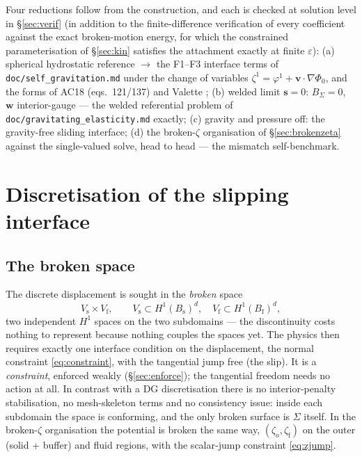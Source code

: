 \documentclass[11pt]{article}
\newcommand{\eps}{\varepsilon}
\newcommand{\Bs}{B_{\mathrm{s}}}
\newcommand{\Bf}{B_{\mathrm{f}}}
\newcommand{\bs}{\mathbf{s}}
\newcommand{\bv}{\mathbf{v}}
\newcommand{\bw}{\mathbf{w}}
\begin{document}
Four reductions follow from the construction, and each is checked at
solution level in \S\ref{sec:verif} (in addition to the
finite-difference verification of every coefficient against the exact
broken-motion energy, for which the constrained parameterisation of
\S\ref{sec:kin} satisfies the attachment exactly at finite $\eps$):
(a) spherical hydrostatic reference $\to$ the F1--F3 interface terms
of \texttt{doc/self\_gravitation.md} under the change of variables
$\zeta^1 = \varphi^1 + \bv\cdot\nabla\Phi_0$, and the forms of AC18
(eqs.~121/137) \cite{AC18} and Valette \cite{Valette1986};
(b) welded limit $\bs = 0$: $B_\Sigma = 0$, $\bw$ interior-gauge --- the
welded referential problem of \texttt{doc/gravitating\_elasticity.md}
exactly; (c) gravity and pressure off: the gravity-free sliding
interface; (d) the broken-$\zeta$ organisation of
\S\ref{sec:brokenzeta} against the single-valued solve, head to head
--- the mismatch self-benchmark.

\section{Discretisation of the slipping interface}
\label{sec:disc}

\subsection{The broken space}

The discrete displacement is sought in the \emph{broken} space
\begin{equation}
  V_{\mathrm{s}} \times V_{\mathrm{f}}, \qquad
  V_{\mathrm{s}} \subset H^{1}(\Bs)^{d}, \quad
  V_{\mathrm{f}} \subset H^{1}(\Bf)^{d},
\end{equation}
two independent $H^{1}$ spaces on the two subdomains --- the
discontinuity costs nothing to represent because nothing couples the
spaces yet. The physics then requires exactly one interface condition on
the displacement, the normal constraint \eqref{eq:constraint}, with the
tangential jump free (the slip). It is a \emph{constraint}, enforced
weakly (\S\ref{sec:enforce}); the tangential freedom needs no action at
all. In contrast with a DG discretisation there is no interior-penalty
stabilisation, no mesh-skeleton terms and no consistency issue: inside
each subdomain the space is conforming, and the only broken surface is
$\Sigma$ itself. In the broken-$\zeta$ organisation the potential is
broken the same way, $(\zeta_o, \zeta_{\mathrm{f}})$ on the outer (solid
+ buffer) and fluid regions, with the scalar-jump constraint
\eqref{eq:zjump}.
\end{document}
